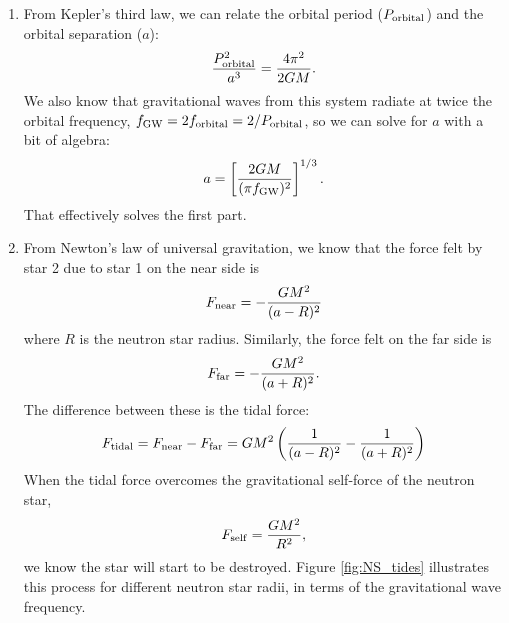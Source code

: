 \documentclass[11pt]{article}
\begin{document}
\begin{enumerate}

\item From Kepler's third law, we can relate the orbital period ($P_{\rm orbital}$) and the orbital separation ($a$):
\[
\frac{P^2_{\rm orbital}}{a^3} = \frac{4\pi^2}{2GM}.
\]
We also know that gravitational waves from this system radiate at twice the orbital frequency, $f_{\rm GW} = 2f_{\rm orbital} = 2/P_{\rm orbital}$, so we can solve for $a$ with a bit of algebra:
\begin{equation}
a = \left[ \frac{2GM}{(\pi f_{\rm GW})^2} \right]^{1/3}.
\end{equation}
That effectively solves the first part.

\item From Newton's law of universal gravitation, we know that the force felt by star 2 due to star 1 on the near side is
\begin{equation}
F_{\rm near} = -\frac{GM^2}{(a - R)^2}
\end{equation}
where $R$ is the neutron star radius. Similarly, the force felt on the far side is
\begin{equation}
F_{\rm far} = -\frac{GM^2}{(a + R)^2}.
\end{equation}
The difference between these is the tidal force:
\begin{equation}
F_{\rm tidal} = F_{\rm near} - F_{\rm far} = GM^2 \left( \frac{1}{(a - R)^2} - \frac{1}{(a + R)^2} \right)
\end{equation}
When the tidal force overcomes the gravitational self-force of the neutron star,
\begin{equation}
F_{\rm self} = \frac{GM^2}{R^2},
\end{equation}
we know the star will start to be destroyed. Figure \ref{fig:NS_tides} illustrates this process for different neutron star radii, in terms of the gravitational wave frequency.

\end{enumerate}
\end{document}
